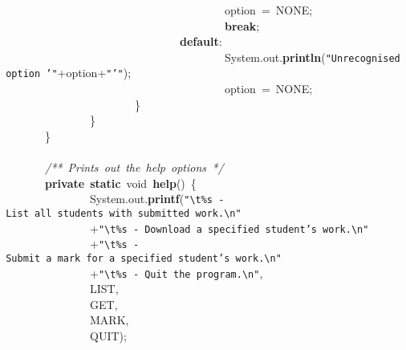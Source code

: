 \mbox{}\ \ \ \ \ \ \ \ \ \ \ \ \ \ \ \ \ \ \ \ \ \ \ \ \ \ \ \ \ \ \ \ \ \ \ \ \ \ \ \ option\ =\ NONE; \\
\mbox{}\ \ \ \ \ \ \ \ \ \ \ \ \ \ \ \ \ \ \ \ \ \ \ \ \ \ \ \ \ \ \ \ \ \ \ \ \ \ \ \ \textbf{break}; \\
\mbox{}\ \ \ \ \ \ \ \ \ \ \ \ \ \ \ \ \ \ \ \ \ \ \ \ \ \ \ \ \ \ \ \ \textbf{default}: \\
\mbox{}\ \ \ \ \ \ \ \ \ \ \ \ \ \ \ \ \ \ \ \ \ \ \ \ \ \ \ \ \ \ \ \ \ \ \ \ \ \ \ \ System.out.\textbf{println}(\texttt{"{}Unrecognised\ option\ '"{}}+option+\texttt{"{}'"{}}); \\
\mbox{}\ \ \ \ \ \ \ \ \ \ \ \ \ \ \ \ \ \ \ \ \ \ \ \ \ \ \ \ \ \ \ \ \ \ \ \ \ \ \ \ option\ =\ NONE; \\
\mbox{}\ \ \ \ \ \ \ \ \ \ \ \ \ \ \ \ \ \ \ \ \ \ \ \ \} \\
\mbox{}\ \ \ \ \ \ \ \ \ \ \ \ \ \ \ \ \} \\
\mbox{}\ \ \ \ \ \ \ \ \} \\
\mbox{}\ \ \ \ \ \ \ \  \\
\mbox{}\ \ \ \ \ \ \ \ \textit{/**\ Prints\ out\ the\ help\ options\ */} \\
\mbox{}\ \ \ \ \ \ \ \ \textbf{private}\ \textbf{static}\ void\ \textbf{help}()\ \{ \\
\mbox{}\ \ \ \ \ \ \ \ \ \ \ \ \ \ \ \ System.out.\textbf{printf}(\texttt{"{}}\texttt{\textbackslash{}t}\texttt{\%s\ -\ List\ all\ students\ with\ submitted\ work.}\texttt{\textbackslash{}n}\texttt{"{}} \\
\mbox{}\ \ \ \ \ \ \ \ \ \ \ \ \ \ \ \ +\texttt{"{}}\texttt{\textbackslash{}t}\texttt{\%s\ -\ Download\ a\ specified\ student's\ work.}\texttt{\textbackslash{}n}\texttt{"{}} \\
\mbox{}\ \ \ \ \ \ \ \ \ \ \ \ \ \ \ \ +\texttt{"{}}\texttt{\textbackslash{}t}\texttt{\%s\ -\ Submit\ a\ mark\ for\ a\ specified\ student's\ work.}\texttt{\textbackslash{}n}\texttt{"{}} \\
\mbox{}\ \ \ \ \ \ \ \ \ \ \ \ \ \ \ \ +\texttt{"{}}\texttt{\textbackslash{}t}\texttt{\%s\ -\ Quit\ the\ program.}\texttt{\textbackslash{}n}\texttt{"{}},\  \\
\mbox{}\ \ \ \ \ \ \ \ \ \ \ \ \ \ \ \ LIST,\  \\
\mbox{}\ \ \ \ \ \ \ \ \ \ \ \ \ \ \ \ GET,\  \\
\mbox{}\ \ \ \ \ \ \ \ \ \ \ \ \ \ \ \ MARK,\  \\
\mbox{}\ \ \ \ \ \ \ \ \ \ \ \ \ \ \ \ QUIT); \\
